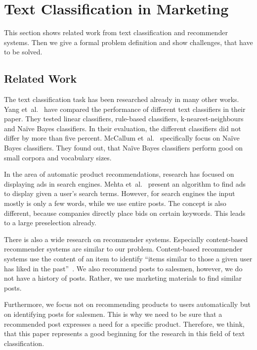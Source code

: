 
\section{Text Classification in Marketing}
\label{sec:background}

This section shows related work from text classification and recommender systems.
Then we give a formal problem definition and show challenges, that have to be solved.

\subsection{Related Work}
The text classification task has been researched already in many other works.
Yang et~al.~\cite{yang1999re} have compared the performance of different text classifiers in their paper.
They tested linear classifiers, rule-based classifiers, k-nearest-neighbours and Na\"ive Bayes classifiers.
In their evaluation, the different classifiers did not differ by more than five percent.
McCallum et~al.~\cite{mccallum1998comparison} specifically focus on Na\"ive Bayes classifiers.
They found out, that Na\"ive Bayes classifiers perform good on small corpora and vocabulary sizes.

In the area of automatic product recommendations, research has focused on displaying ads in search engines.
Mehta et~al.~\cite{mehta2007adwords} present an algorithm to find ads to display given a user's search terms.
However, for search engines the input mostly is only a few words, while we use entire posts.
The concept is also different, because companies directly place bids on certain keywords.
This leads to a large preselection already.

There is also a wide research on recommender systems. 
Especially content-based recommender systems are similar to our problem.
Content-based recommender systems use the content of an item to identify ``items similar to those a given user has liked in the past''~\cite{lops2011content}.
We also recommend posts to salesmen, however, we do not have a history of posts.
Rather, we use marketing materials to find similar posts.

Furthermore, we focus not on recommending products to users automatically but on identifying posts for salesmen.
This is why we need to be sure that a recommended post expresses a need for a specific product.
Therefore, we think, that this paper represents a good beginning for the research in this field of text classification.

